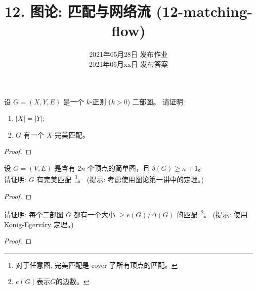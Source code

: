 \documentclass[a4paper, justified]{tufte-handout}
\title{12. 图论: 匹配与网络流 (12-matching-flow)}
\date{2021年05月28日 发布作业 \\ 2021年06月xx日 发布答案}
\begin{document}
\maketitle
\noplagiarism %
\begin{abstract}
\end{abstract}
\beginrequired

\begin{problem}[\score{5 = 2 + 3} $\star\star$]
  设 $G = (X, Y, E)$ 是一个 $k$-正则 ($k > 0$) 二部图。
  请证明:
  \begin{enumerate}[(1)]
    \item $|X| = |Y|$;
    \item $G$ 有一个 $X$-完美匹配。
  \end{enumerate}
\end{problem}

\begin{proof}
\end{proof}

\begin{problem}
  设 $G = (V, E)$ 是含有 $2n$ 个顶点的简单图，且 $\delta(G) \ge n + 1$。\\
  请证明: $G$ 有完美匹配~\footnote{对于任意图, 完美匹配是 cover 了所有顶点的匹配。}。
  (提示: 考虑使用图论第一讲中的定理。)
\end{problem}

\begin{proof}
\end{proof}

\begin{problem}
  请证明: 每个二部图 $G$ 都有一个大小 $\ge e(G)/\Delta(G)$ 的匹配~\footnote{$e(G)$表示$G$的边数。}。
  (提示: 使用 K\"{o}nig-Egerv\'{a}ry 定理。)
\end{problem}

\begin{proof}
\end{proof}
\end{document}
